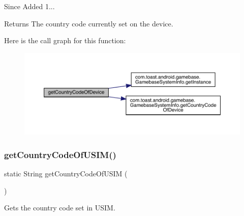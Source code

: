 \begin{DoxySince}{Since}
Added 1... 
\end{DoxySince}
\begin{DoxyReturn}{Returns}
The country code currently set on the device. 
\end{DoxyReturn}
Here is the call graph for this function\+:
\nopagebreak
\begin{figure}[H]
\begin{center}
\leavevmode
\includegraphics[width=350pt]{classcom_1_1toast_1_1android_1_1gamebase_1_1_gamebase_aa5cb9db9a02d57d19f78a34a1adbdc95_cgraph}
\end{center}
\end{figure}
\mbox{\label{classcom_1_1toast_1_1android_1_1gamebase_1_1_gamebase_aefed09bea0026a9e6de3c0506ebd5617}} 
\subsubsection{\texorpdfstring{get\+Country\+Code\+Of\+U\+S\+I\+M()}{getCountryCodeOfUSIM()}}
{\footnotesize\ttfamily static String get\+Country\+Code\+Of\+U\+S\+IM (\begin{DoxyParamCaption}{ }\end{DoxyParamCaption})\hspace{0.3cm}{\ttfamily [static]}}



Gets the country code set in U\+S\+IM. 


